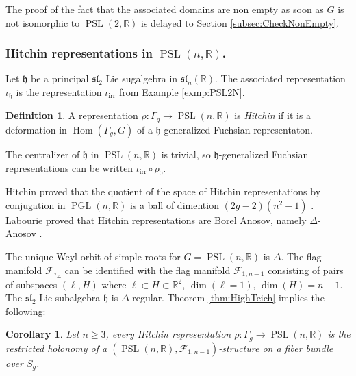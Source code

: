 \documentclass[reqno,10pt]{amsart}
\theoremstyle{plain}
\newtheorem{cor}[thm]{Corollary}
\theoremstyle{definition}
\newtheorem{defn}[thm]{Definition}
\theoremstyle{remark}
\newcommand{\type}{\tau}
\newcommand{\R}{\mathbb{R}}
\DeclareMathOperator{\Hom}{Hom}
\DeclareMathOperator{\PSL}{PSL}
\DeclareMathOperator{\PGL}{PGL}
\newcommand{\ie}{namely }
\begin{document}
The proof of the fact that the associated domains are non empty as soon as $G$ is not isomorphic to $\PSL(2, \R)$ is delayed to Section \ref{subsec:CheckNonEmpty}.

\subsubsection{Hitchin representations in \texorpdfstring{$\PSL(n,\R)$}{PSL(n,R)}.}
\label{sec:TeichSL3}
Let $\mathfrak{h}$ be a principal $\mathfrak{sl}_2$ Lie sugalgebra in $\mathfrak{sl}_n(\R)$. The associated representation $\iota_\mathfrak{h}$ is the representation $\iota_\text{irr}$ from Example \ref{exmp:PSL2N}.

\begin{defn}
A representation $\rho:\Gamma_g\to \PSL(n,\R)$ is \emph{Hitchin} if it is a deformation in $\Hom(\Gamma_g,G)$ of a $\mathfrak{h}$-generalized Fuchsian representaton.
\end{defn}

 The centralizer of $\mathfrak{h}$ in $\PSL(n,\R)$ is trivial, so $\mathfrak{h}$-generalized Fuchsian representations can be written $\iota_\text{irr}\circ \rho_0$.

\medskip

Hitchin proved that the quotient of the space of Hitchin representations by conjugation in $\PGL(n,\R)$ is a ball of dimention $(2g-2)(n^2-1)$ \cite{Hitchin}. Labourie proved that Hitchin representations are Borel Anosov, \ie $\Delta$-Anosov \cite{Labourie}. 

\medskip

The unique Weyl orbit of simple roots for $G=\PSL(n,\R)$ is $\Delta$. The flag manifold $\mathcal{F}_{\type_\Delta}$ can be identified with the flag manifold $\mathcal{F}_{1,{n-1}}$ consisting of 
pairs of subspaces $(\ell,H)$ where $\ell\subset H\subset \R^2$, $\dim(\ell=1)$, $\dim(H)=n-1$. The $\mathfrak{sl}_2$ Lie subalgebra $\mathfrak{h}$ is $\Delta$-regular. Theorem \ref{thm:HighTeich} implies the following:

\begin{cor}
Let $n\geq 3$, every Hitchin representation $\rho:\Gamma_g\to \PSL(n,\R)$ is the restricted holonomy of a $(\PSL(n,\R),\mathcal{F}_{1,n-1})$-structure on a fiber bundle over $S_g$.
\end{cor}

\medskip
\end{document}
